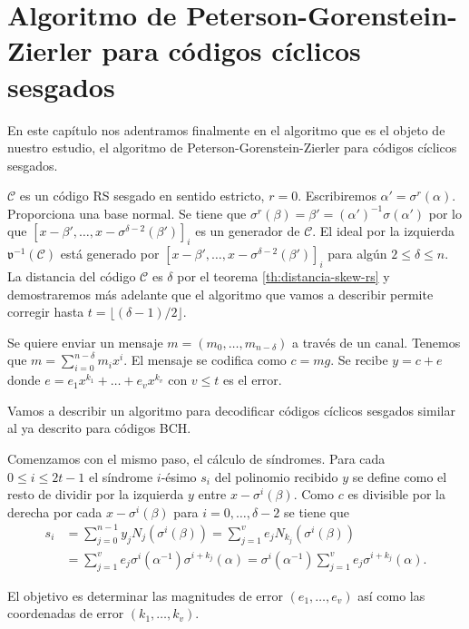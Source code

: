 \chapter{Algoritmo de Peterson-Gorenstein-Zierler para códigos cíclicos sesgados}

En este capítulo nos adentramos finalmente en el algoritmo que es el objeto de nuestro estudio, el algoritmo de Peterson-Gorenstein-Zierler para códigos cíclicos sesgados.

\(\mathcal C\) es un código RS sesgado en sentido estricto, \(r = 0\).
Escribiremos \(\alpha' = \sigma^r(\alpha)\).
Proporciona una base normal.
Se tiene que \(\sigma^r(\beta) = \beta' = (\alpha')^{-1}\sigma(\alpha')\) por lo que \([x - \beta', \dots, x - \sigma^{\delta - 2}(\beta')]_i\) es un generador de \(\mathcal C\).
El ideal por la izquierda \(\mathfrak v^{-1}(\mathcal C)\) está generado por \([x - \beta', \dots, x - \sigma^{\delta - 2}(\beta')]_i\) para algún \(2 \leq \delta \leq n\).
La distancia del código \(\mathcal C\) es \(\delta\) por el teorema \ref{th:distancia-skew-rs} y demostraremos más adelante que el algoritmo que vamos a describir permite corregir hasta \(t = \lfloor (\delta - 1)/2 \rfloor\).

Se quiere enviar un mensaje \(m = (m_0, \dots, m_{n - \delta})\) a través de un canal.
Tenemos que \(m = \sum_{i=0}^{n-\delta}m_ix^{i}\).
El mensaje se codifica como \(c = mg\).
Se recibe \(y = c + e\) donde \(e = e_1x^{k_1} + \dots + e_vx^{k_v}\) con \(v \leq t\) es el error.

Vamos a describir un algoritmo para decodificar códigos cíclicos sesgados similar al ya descrito para códigos BCH.

Comenzamos con el mismo paso, el cálculo de síndromes.
Para cada \(0 \leq i \leq 2t - 1\) el síndrome \(i\)-ésimo \(s_i\) del polinomio recibido \(y\) se define como el resto de dividir por la izquierda \(y\) entre \(x - \sigma^{i}(\beta)\).
Como \(c\) es divisible por la derecha por cada \(x - \sigma^{i}(\beta)\) para \(i = 0, \dots, \delta - 2\) se tiene que 
\begin{align}
  s_i &= \sum_{j = 0}^{n-1}y_jN_j(\sigma^{i}(\beta)) = \sum_{j=1}^{v}e_jN_{k_j}(\sigma^{i}(\beta))\nonumber\\
   &= \sum_{j = 1}^{v}e_j\sigma^{i}(\alpha^{-1})\sigma^{i+k_j}(\alpha) = \sigma^{i}(\alpha^{-1})\sum_{j = 1}^{v}e_j\sigma^{i+k_j}(\alpha).
   \label{eq:sindromes-sesgados}
\end{align}

El objetivo es determinar las magnitudes de error \((e_{1}, \dots, e_{v})\) así como las coordenadas de error \((k_1, \dots, k_v)\).

